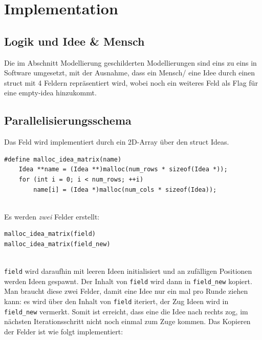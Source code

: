 \section{Implementation}
\subsection{Logik und Idee \& Mensch}
Die im Abschnitt Modellierung geschilderten Modellierungen sind eins zu eins in Software umgesetzt, mit der Ausnahme, dass ein Mensch/ eine Idee durch einen struct mit 4 Feldern repräsentiert wird, wobei noch ein weiteres Feld als Flag für eine empty-idea hinzukommt.

\subsection{Parallelisierungsschema}

Das Feld wird implementiert durch ein 2D-Array über den struct Ideas.

\begin{verbatim}
#define malloc_idea_matrix(name)                              
    Idea **name = (Idea **)malloc(num_rows * sizeof(Idea *)); 
    for (int i = 0; i < num_rows; ++i)                        
        name[i] = (Idea *)malloc(num_cols * sizeof(Idea)); 
\end{verbatim}
\quad \\
Es werden \textit{zwei} Felder erstellt:

\begin{verbatim}
malloc_idea_matrix(field)
malloc_idea_matrix(field_new)
\end{verbatim}
\quad \\
\texttt{field} wird daraufhin mit leeren Ideen initialisiert und an zufälligen Positionen werden Ideen gespawnt. 
Der Inhalt von \texttt{field} wird dann in \texttt{field\_new} kopiert. 
Man braucht diese zwei Felder, damit eine Idee nur ein mal pro Runde ziehen kann: 
es wird über den Inhalt von \texttt{field} iteriert, der Zug Ideen wird in \texttt{field\_new} vermerkt. 
Somit ist erreicht, dass eine die Idee nach rechts zog, im nächsten Iterationsschritt nicht noch einmal zum Zuge kommen. 
Das Kopieren der Felder ist wie folgt implementiert:

